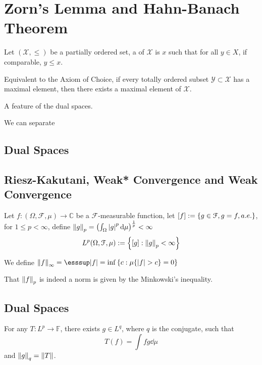 \section{Zorn's Lemma and Hahn-Banach Theorem}

Let \((\mathcal{X},\leq)\) be a partially ordered set, a  of \(\mathcal{X}\) is \(x\) such that for all \(y\in X\), if comparable, \(y\leq x\). 

\begin{thm}
    Equivalent to the Axiom of Choice, if every totally ordered subset \(\mathcal{Y}\subset \mathcal{X}\) has a maximal element, then there exists a maximal element of \(\mathcal{X}\).
\end{thm}

\begin{thm}
    A feature of the dual spaces. 
\end{thm}

\begin{thm}
    We can separate
\end{thm}

\subsection{Dual Spaces}

\subsection{Riesz-Kakutani, Weak* Convergence and Weak Convergence}



Let \(f: (\Omega, \mathcal{F}, \mu) \to \mathbb{C}\) be a \(\mathcal{F}\)-measurable function, let \([f]:= \Bqty{g \in \mathcal{F}, g = f, a.e.}\), for \(1 \leq p < \infty\), define \(\norm{g}_{p} = \pqty{\int_{\Omega} \abs{g}^{p} \dd{\mu}}^{\frac{1}{p}} < \infty\)
\begin{equation*}
    L^{p}(\Omega, \mathcal{F}, \mu) := \Bqty{[g]: \norm{g}_{p} < \infty}
\end{equation*}

We define \(\norm{f}_{\infty} = \esssup \abs{f} = \inf \Bqty{c: \mu\Bqty{\abs{f}> c} = 0}\)

That \(\norm{f}_{p}\) is indeed a norm is given by the Minkowski's inequality. 

\subsection{Dual Spaces}

For any  \(T : L^{p} \to \mathbb{F}\), there exists \(g \in L^{q}\), where \(q\) is the conjugate, such that 
\begin{equation*}
    T(f) = \int fg \dd{\mu}
\end{equation*}
and \(\norm{g}_{q} = \norm{T}\).
